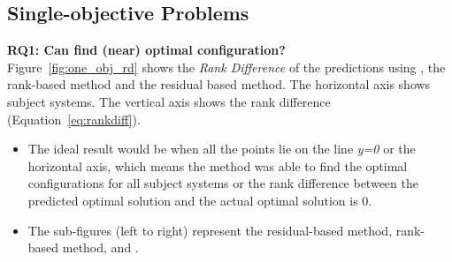 \subsection{Single-objective Problems}\label{sec:so_results}
\noindent\textbf{RQ1: Can  \flash find (near) optimal configuration?}\\
Figure~\ref{fig:one_obj_rd} shows the \textit{Rank Difference} of the predictions using \flash, the rank-based method and the residual based method. 
The horizontal axis shows subject systems. The vertical axis shows the rank difference (Equation~\ref{eq:rankdiff}).
\begin{itemize}[leftmargin=*]
    \item 
    The ideal result would be when all the points lie on the line \textit{y=0} or the horizontal axis, which means the method was able to find the optimal configurations for all subject systems or the rank difference between the predicted optimal solution and the actual optimal solution is 0. 
    \item The sub-figures (left to right) represent the residual-based method, rank-based method, and \flash.
\end{itemize}

